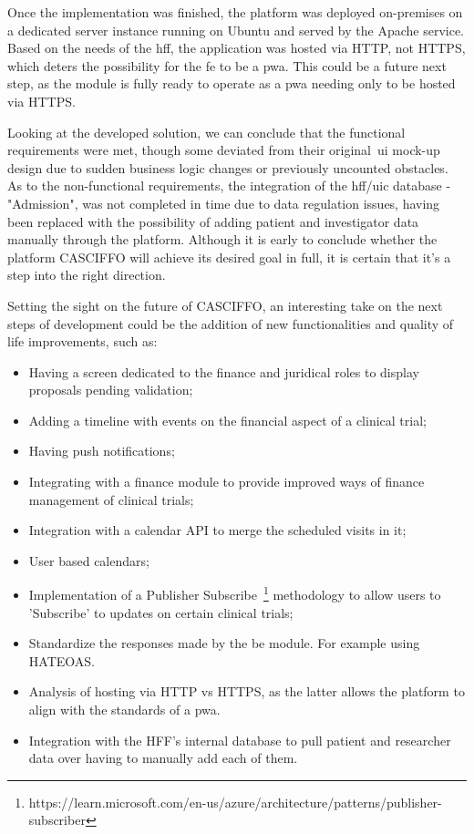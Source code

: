 Once the implementation was finished, the platform was deployed on-premises on a dedicated server instance running on Ubuntu and served by the Apache service. Based on the needs of the \acrshort{hff}, the application was hosted via HTTP, not HTTPS, which deters the possibility for the \acrshort{fe} to be a \acrshort{pwa}. This could be a future next step, as the module is fully ready to operate as a \acrshort{pwa} needing only to be hosted via HTTPS.

Looking at the developed solution, we can conclude that the functional requirements were met, though some deviated from their original~\acrshort{ui} mock-up design due to sudden business logic changes or previously uncounted obstacles.
As to the non-functional requirements, the integration of the \acrshort{hff}/\acrshort{uic} database - "Admission", was not completed in time due to data regulation issues, having been replaced with the possibility of adding patient and investigator data manually through the platform.
Although it is early to conclude whether the platform CASCIFFO will achieve its desired goal in full, it is certain that it's a step into the right direction.

Setting the sight on the future of CASCIFFO, an interesting take on the next steps of development could be the addition of new functionalities and quality of life improvements, such as:
\begin{itemize}
    \item Having a screen dedicated to the finance and juridical roles to display proposals pending validation; 
    \item Adding a timeline with events on the financial aspect of a clinical trial;
    \item Having push notifications;
    \item Integrating with a finance module to provide improved ways of finance management of clinical trials;
    \item Integration with a calendar API to merge the scheduled visits in it;
    \item User based calendars;
    \item Implementation of a Publisher Subscribe~\footnote{https://learn.microsoft.com/en-us/azure/architecture/patterns/publisher-subscriber}\label{fn:pub-sub} methodology to allow users to 'Subscribe' to updates on certain clinical trials;
    \item Standardize the responses made by the \acrlong{be} module. For example using HATEOAS.
    \item Analysis of hosting via HTTP vs HTTPS, as the latter allows the platform to align with the standards of a \acrshort{pwa}.
    \item Integration with the HFF's internal database to pull patient and researcher data over having to manually add each of them.
\end{itemize}
